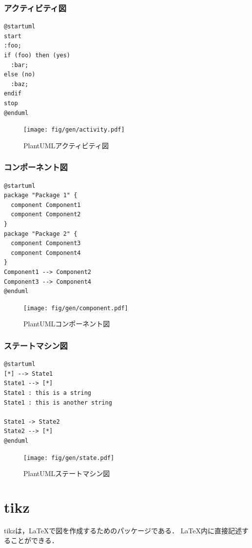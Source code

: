 \documentclass[main]{subfiles}
\begin{document}
\subsubsection{アクティビティ図}

\begin{verbatim}
@startuml
start
:foo;
if (foo) then (yes)
  :bar;
else (no)
  :baz;
endif
stop
@enduml
\end{verbatim}

\begin{figure}[H]
  \centering
  \texttt{[image: fig/gen/activity.pdf]}
  \caption{PlantUMLアクティビティ図}
  \label{fig:pumlactivity}
\end{figure}

\subsubsection{コンポーネント図}

\begin{verbatim}
@startuml
package "Package 1" {
  component Component1
  component Component2
}
package "Package 2" {
  component Component3
  component Component4
}
Component1 --> Component2
Component3 --> Component4
@enduml
\end{verbatim}

\begin{figure}[H]
  \centering
  \texttt{[image: fig/gen/component.pdf]}
  \caption{PlantUMLコンポーネント図}
  \label{fig:pumlcomponent}
\end{figure}

\subsubsection{ステートマシン図}

\begin{verbatim}
@startuml
[*] --> State1
State1 --> [*]
State1 : this is a string
State1 : this is another string

State1 -> State2
State2 --> [*]
@enduml
\end{verbatim}

\begin{figure}[H]
  \centering
  \texttt{[image: fig/gen/state.pdf]}
  \caption{PlantUMLステートマシン図}
  \label{fig:pumlstate}
\end{figure}

\section{tikz}
tikzは，\LaTeX{}で図を作成するためのパッケージである．
\LaTeX{}内に直接記述することができる．
\end{document}
